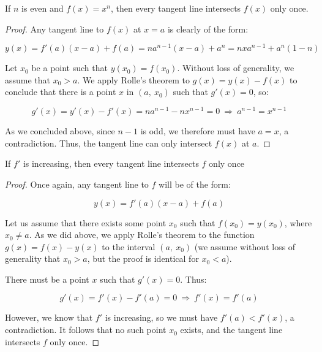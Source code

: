 \documentclass[10pt, oneside]{amsart}
\newenvironment{problem}[2][Problem]{\begin{trivlist}
\item[\hskip \labelsep {\bfseries #1}\hskip \labelsep {\bfseries #2.}]}{\end{trivlist}}
\begin{document}
    \begin{problem}{11.58}
      If $n$ is even and $f(x) = x^n$, then every tangent line intersects $f(x)$ only once.
    \end{problem}

    \begin{proof}
    Any tangent line to $f(x)$ at $x = a$ is clearly of the form:

    $$y(x) = f'(a)(x - a) + f(a) = na^{n - 1}(x - a) + a^n = nxa^{n - 1} + a^n(1 - n)$$

    Let $x_0$ be a point such that $y(x_0) = f(x_0)$. Without loss of generality, we assume that $x_0 > a$. We apply Rolle's theorem to $g(x) = y(x) - f(x)$
    to conclude that there is a point $x$ in $(a, \ x_0)$ such that $g'(x) = 0$, so:

    $$g'(x) = y'(x) - f'(x) = na^{n - 1} - nx^{n - 1} = 0 \ \Rightarrow \ a^{n - 1} = x^{n - 1}$$

    As we concluded above, since $n - 1$ is odd, we therefore must have $a = x$, a contradiction. Thus, the tangent line can only intersect $f(x)$ at $a$.
    \end{proof}

    \begin{problem}{11}
      If $f'$ is increasing, then every tangent line intersects $f$ only once
    \end{problem}

    \begin{proof}
      Once again, any tangent line to $f$ will be of the form:

      $$y(x) = f'(a)(x - a) + f(a)$$

      Let us assume that there exists some point $x_0$ such that $f(x_0) = y(x_0)$, where $x_0 \neq a$. As we did above, we apply Rolle's theorem
      to the function $g(x) = f(x) - y(x)$ to the interval $(a, \ x_0)$ (we assume without loss of generality that $x_0 > a$, but the proof is identical
      for $x_0 < a$).
      \newline

      There must be a point $x$ such that $g'(x) = 0$. Thus:

      $$g'(x) = f'(x) - f'(a) = 0 \ \Rightarrow \ f'(x) = f'(a)$$

      However, we know that $f'$ is increasing, so we must have $f'(a) < f'(x)$, a contradiction. It follows that no such
      point $x_0$ exists, and the tangent line intersects $f$ only once.
    \end{proof}
\end{document}
